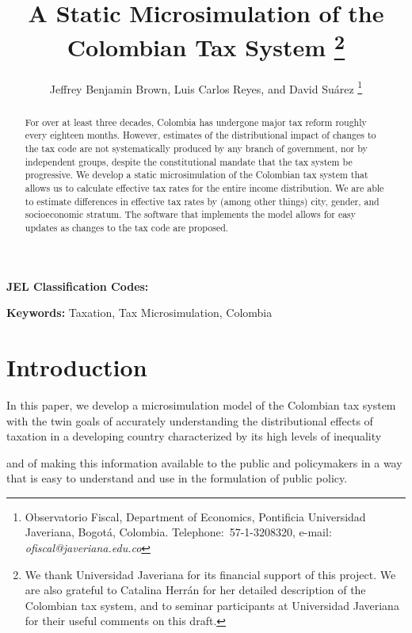 \documentclass[12pt]{article}
\begin{document}
\title{A Static Microsimulation of the Colombian Tax System
  \thanks{We thank Universidad Javeriana for its financial support of this project.
    We are also grateful to Catalina Herr\'{a}n for her detailed description of the Colombian tax system,
    and to seminar participants at Universidad Javeriana for their useful comments on this draft.}}
\author{Jeffrey Benjamin Brown, Luis Carlos Reyes, and David Su\'{a}rez
  \thanks{Observatorio Fiscal,
    Department of Economics, Pontificia Universidad Javeriana, Bogot\'{a}, Colombia.
    Telephone:\ 57-1-3208320,
    e-mail: \textit{ofiscal@javeriana.edu.co}}}

\maketitle
\begin{abstract}
  For over at least three decades,
  Colombia has undergone major tax reform roughly every eighteen months.
  However, estimates of the distributional impact of changes to the tax code
  are not systematically produced by any branch of government,
  nor by independent groups,
  despite the constitutional mandate that the tax system be progressive.
  We develop a static microsimulation of the Colombian tax system
  that allows us to calculate effective tax rates
  for the entire income distribution.
  We are able to estimate differences in effective tax rates by
  (among other things) city, gender, and socioeconomic stratum.
  The software that implements the model allows for
  easy updates as changes to the tax code are proposed.
 \end{abstract}

\textbf{JEL Classification Codes:}

\textbf{Keywords:} Taxation, Tax Microsimulation, Colombia
\pagebreak%
\doublespacing

\section{Introduction}

In this paper, we develop a microsimulation model of the Colombian tax system
with the twin goals of
accurately understanding the distributional effects of taxation
in a developing country characterized by its high levels of inequality
\iffalse
    [[AN ECONOMIST:
    and informality?
    I suspect the answer is that no,
    the simulation currently has nothing to say about informality.
    While we do have a ``making pension contributions'' variable,
    we don't even report it in the final output tables,
    and the word ``formal'' only shows up twice in the simulation code,
    in the very early stages, as if we thought we might use it but never did.
    ]],
\fi
and of making this information available to the public and policymakers
in a way that is easy to understand and use in the formulation of public policy.
\end{document}
